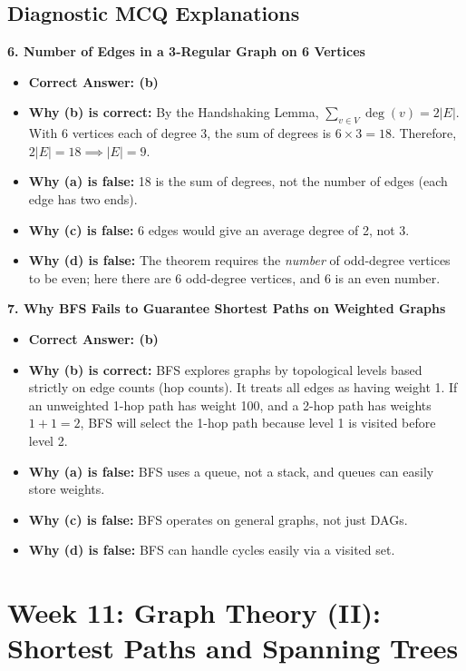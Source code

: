 \subsection*{Diagnostic MCQ Explanations}

\textbf{6. Number of Edges in a 3-Regular Graph on 6 Vertices}
\begin{itemize}
    \item \textbf{Correct Answer: (b)}
    \item \textbf{Why (b) is correct:} By the Handshaking Lemma, $\sum_{v \in V} \deg(v) = 2|E|$. With 6 vertices each of degree 3, the sum of degrees is $6 \times 3 = 18$. Therefore, $2|E| = 18 \implies |E| = 9$.
    \item \textbf{Why (a) is false:} 18 is the sum of degrees, not the number of edges (each edge has two ends).
    \item \textbf{Why (c) is false:} 6 edges would give an average degree of 2, not 3.
    \item \textbf{Why (d) is false:} The theorem requires the \textit{number} of odd-degree vertices to be even; here there are 6 odd-degree vertices, and 6 is an even number.
\end{itemize}

\textbf{7. Why BFS Fails to Guarantee Shortest Paths on Weighted Graphs}
\begin{itemize}
    \item \textbf{Correct Answer: (b)}
    \item \textbf{Why (b) is correct:} BFS explores graphs by topological levels based strictly on edge counts (hop counts). It treats all edges as having weight 1. If an unweighted 1-hop path has weight 100, and a 2-hop path has weights $1 + 1 = 2$, BFS will select the 1-hop path because level 1 is visited before level 2.
    \item \textbf{Why (a) is false:} BFS uses a queue, not a stack, and queues can easily store weights.
    \item \textbf{Why (c) is false:} BFS operates on general graphs, not just DAGs.
    \item \textbf{Why (d) is false:} BFS can handle cycles easily via a visited set.
\end{itemize}

\section*{Week 11: Graph Theory (II): Shortest Paths and Spanning Trees}

